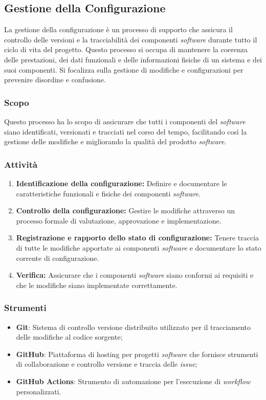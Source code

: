 \subsection{Gestione della Configurazione}

La gestione della configurazione è un processo di supporto che assicura il
controllo delle versioni e la tracciabilità dei componenti \textit{software}
durante tutto il ciclo di vita del progetto.
Questo processo si occupa di mantenere la coerenza delle prestazioni, dei dati
funzionali e delle informazioni fisiche di un sistema e dei suoi componenti.
Si focalizza sulla gestione di modifiche e configurazioni per prevenire
disordine e confusione.

\subsubsection{Scopo}
Questo processo ha lo scopo di assicurare che tutti i componenti del
\textit{software} siano identificati, versionati e tracciati nel corso del
tempo, facilitando così la gestione delle modifiche e migliorando la qualità
del prodotto \textit{software}.

\subsubsection{Attività}
\begin{enumerate}
	\item \textbf{Identificazione della configurazione:} Definire e documentare
	      le caratteristiche funzionali e fisiche dei componenti
	      \textit{software}.
	\item \textbf{Controllo della configurazione:} Gestire le modifiche
	      attraverso un processo formale di valutazione, approvazione e
	      implementazione.
	\item \textbf{Registrazione e rapporto dello stato di configurazione:}
	      Tenere traccia di tutte le modifiche apportate ai componenti
	      \textit{software} e documentare lo stato corrente di configurazione.
	\item \textbf{Verifica:} Assicurare che i componenti \textit{software} siano
	      conformi ai requisiti e che le modifiche siano implementate
	      correttamente.
\end{enumerate}

\subsubsection{Strumenti}
\begin{itemize}
	\item \textbf{Git}: Sistema di controllo versione distribuito utilizzato per
	      il tracciamento delle modifiche al codice sorgente;
	\item \textbf{GitHub}: Piattaforma di hosting per progetti \textit{software}
	      che fornisce strumenti di collaborazione e controllo versione e
	      traccia delle \textit{issue};
	\item \textbf{GitHub Actions}: Strumento di automazione per l'esecuzione di
	      \textit{workflow} personalizzati.
\end{itemize}
